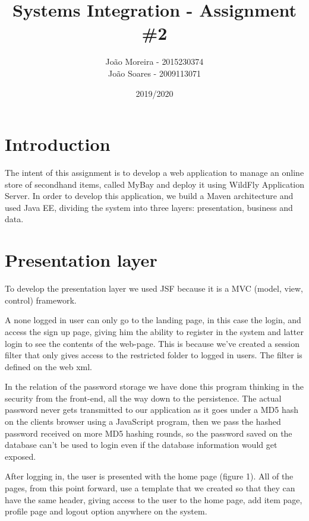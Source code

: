 \documentclass{article}
\title{Systems Integration - Assignment \#2}
\date{2019/2020}
\author{João Moreira - 2015230374 \\ 
João Soares - 2009113071 }
\begin{document}
\maketitle

\section{Introduction}

\qquad The intent of this assignment is to develop a web application to manage an online store of secondhand items, called MyBay and deploy it using WildFly Application Server. In order to develop this application, we build a Maven architecture and used \ac{Java EE}, dividing the system into three layers: presentation, business and data.

\section{Presentation layer}

\qquad To develop the presentation layer we used \ac{JSF} because it is a MVC (model, view, control) framework.

\qquad A none logged in user can only go to the landing page, in this case the login, and access the sign up page, giving him the ability to register in the system and latter login to see the contents of the web-page. This is because we've created a session filter that only gives access to the restricted folder to logged in users. The filter is defined on the web xml.

\qquad In the relation of the password storage we have done this program thinking in the security from the front-end, all the way down to the persistence. The actual password never gets transmitted to our application as it goes under a MD5 hash on the clients browser using a JavaScript program, then we pass the hashed password received on more MD5 hashing rounds, so the password saved on the database can't be used to login even if the database information would get exposed.

\qquad After logging in, the user is presented with the home page (figure 1). All of the pages, from this point forward, use a template that we created so that they can have the same header, giving access to the user to the home page, add item page, profile page and logout option anywhere on the system. 
\end{document}
